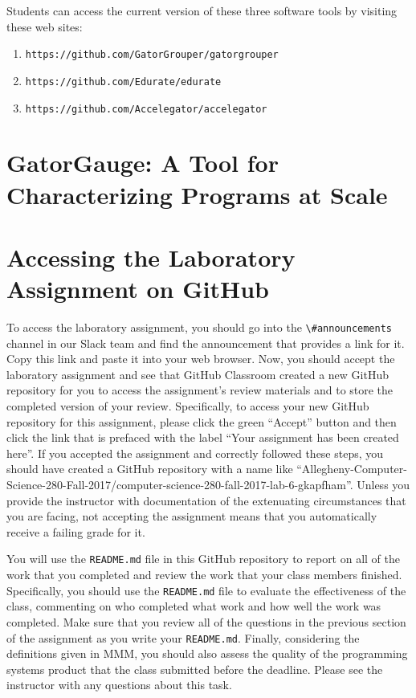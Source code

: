 \documentclass[11pt]{article}
\newcommand{\reflection}{\lstinline{README.md}}
\newcommand{\url}[1]{\lstinline{#1}}
\newcommand{\channel}[1]{\lstinline{#1}}
\begin{document}
\noindent
Students can access the current version of these three software tools by visiting these web sites:

\begin{enumerate}
  \item \url{https://github.com/GatorGrouper/gatorgrouper}
  \item \url{https://github.com/Edurate/edurate}
  \item \url{https://github.com/Accelegator/accelegator}
\end{enumerate}

\section*{GatorGauge: A Tool for Characterizing Programs at Scale}


\section*{Accessing the Laboratory Assignment on GitHub}

To access the laboratory assignment, you should go into the \channel{\#announcements} channel in our Slack team and find
the announcement that provides a link for it. Copy this link and paste it into your web browser. Now, you should accept
the laboratory assignment and see that GitHub Classroom created a new GitHub repository for you to access the
assignment's review materials and to store the completed version of your review. Specifically, to access your new GitHub
repository for this assignment, please click the green ``Accept'' button and then click the link that is prefaced with
the label ``Your assignment has been created here''. If you accepted the assignment and correctly followed these steps,
you should have created a GitHub repository with a name like
``Allegheny-Computer-Science-280-Fall-2017/computer-science-280-fall-2017-lab-6-gkapfham''. Unless you provide the
instructor with documentation of the extenuating circumstances that you are facing, not accepting the assignment means
that you automatically receive a failing grade for it.

You will use the \reflection{} file in this GitHub repository to report on all of the work that you completed and review
the work that your class members finished. Specifically, you should use the \reflection{} file to evaluate the
effectiveness of the class, commenting on who completed what work and how well the work was completed. Make sure that
you review all of the questions in the previous section of the assignment as you write your \reflection{}. Finally,
considering the definitions given in MMM, you should also assess the quality of the programming systems product that the
class submitted before the deadline. Please see the instructor with any questions about this task.
\end{document}
